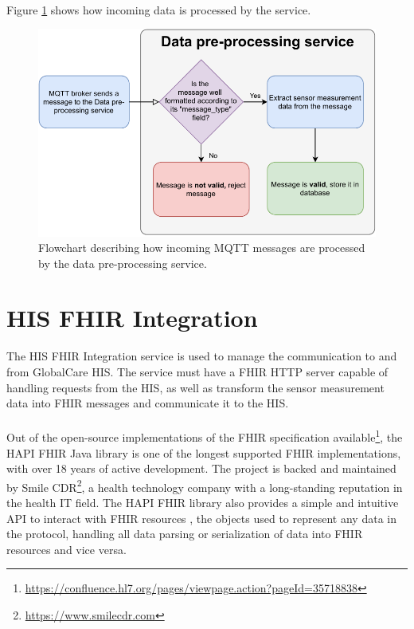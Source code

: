 \paragraph{} Figure \ref{fig:dataprocess_flowdiagram} shows how incoming data is processed by the service. 

\begin{figure}[H]
    \centering
    \includegraphics[width=0.7\linewidth]{images/data pre processing.pdf}
    \caption[Flowchart describing how incoming \acs{MQTT} messages are processed by the data pre-processing service.]{Flowchart describing how incoming \acs{MQTT} messages are processed by the data pre-processing service.}
    \label{fig:dataprocess_flowdiagram}
\end{figure}

\section{\acs{HIS} \acs{FHIR} Integration}
The \acs{HIS} \acs{FHIR} Integration service is used to manage the communication to and from GlobalCare \acs{HIS}. The service must {\color{blue} have} a \acs{FHIR} \acs{HTTP} server \cite{fhir} capable of handling requests from the \acs{HIS}, as well as transform the sensor measurement data into \acs{FHIR} messages and communicate it to the \acs{HIS}.

\paragraph{} Out of the open-source implementations of the \acs{FHIR} specification available\footnote{\url{https://confluence.hl7.org/pages/viewpage.action?pageId=35718838}}, the HAPI FHIR Java library \cite{hapifhir} is one of the longest supported \acs{FHIR} implementations, with over 18 years of active development. The project is backed and maintained by Smile CDR\footnote{\url{https://www.smilecdr.com}}, a health technology company with a long-standing reputation in the health \acs{IT} field. The HAPI FHIR library also provides a simple and intuitive \acs{API} to interact with \acs{FHIR} resources \cite{fhir}, the objects used to represent any data in the protocol, handling all data parsing or serialization of data into \acs{FHIR} resources and vice versa.

